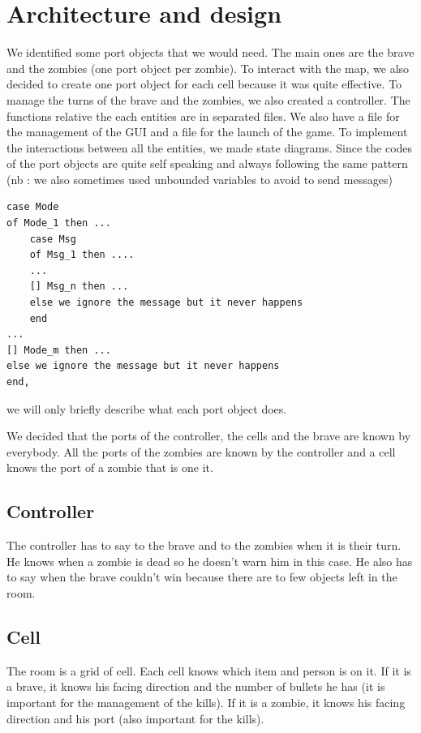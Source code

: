 \documentclass[11pt,a4paper]{article}
\begin{document}
\section{Architecture and design}

We identified some port objects that we would need. The main ones are the brave and the zombies (one port object per zombie). To interact with the map, we also decided to create one port object for each cell because it was quite effective. To manage the turns of the brave and the zombies, we also created a controller. The functions relative the each entities are in separated files. We also have a file for the management of the GUI and a file for the launch of the game. To implement the interactions between all the entities, we made state diagrams. Since the codes of the port objects are quite self speaking and always following the same pattern (nb : we also sometimes used unbounded variables to avoid to send messages)
\begin{lstlisting}[basicstyle=\ttfamily\footnotesize]
case Mode
of Mode_1 then ...
	case Msg
	of Msg_1 then ....
	...
	[] Msg_n then ...
	else we ignore the message but it never happens
	end
...	
[] Mode_m then ...
else we ignore the message but it never happens
end,
\end{lstlisting}
we will only briefly describe what each port object does. 
	
We decided that the ports of the controller, the cells and the brave are known by everybody. All the ports of the zombies are known by the controller and a cell knows the port of a zombie that is one it.

\subsection{Controller}
The controller has to say to the brave and to the zombies when it is their turn. He knows when a zombie is dead so he doesn't warn him in this case.  He also has to say when the brave couldn't win because there are to few objects left in the room. 

\subsection{Cell}
The room is a grid of cell. Each cell knows which item and person is on it. If it is a brave, it knows his facing direction and the number of bullets he has (it is important for the management of the kills). If it is a zombie, it knows his facing direction and his port (also important for the kills).
\end{document}
